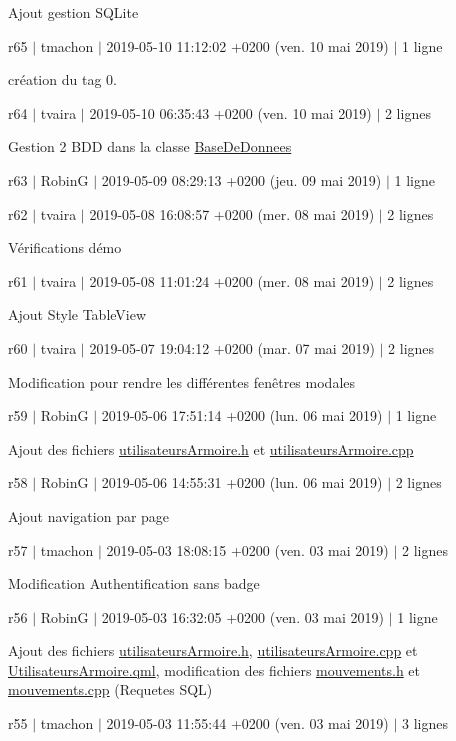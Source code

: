 Ajout gestion S\+Q\+Lite

r65 $\vert$ tmachon $\vert$ 2019-\/05-\/10 11\+:12\+:02 +0200 (ven. 10 mai 2019) $\vert$ 1 ligne

création du tag 0.

r64 $\vert$ tvaira $\vert$ 2019-\/05-\/10 06\+:35\+:43 +0200 (ven. 10 mai 2019) $\vert$ 2 lignes

Gestion 2 B\+DD dans la classe \hyperlink{class_base_de_donnees}{Base\+De\+Donnees}

r63 $\vert$ RobinG $\vert$ 2019-\/05-\/09 08\+:29\+:13 +0200 (jeu. 09 mai 2019) $\vert$ 1 ligne

r62 $\vert$ tvaira $\vert$ 2019-\/05-\/08 16\+:08\+:57 +0200 (mer. 08 mai 2019) $\vert$ 2 lignes

Vérifications démo

r61 $\vert$ tvaira $\vert$ 2019-\/05-\/08 11\+:01\+:24 +0200 (mer. 08 mai 2019) $\vert$ 2 lignes

Ajout Style Table\+View

r60 $\vert$ tvaira $\vert$ 2019-\/05-\/07 19\+:04\+:12 +0200 (mar. 07 mai 2019) $\vert$ 2 lignes

Modification pour rendre les différentes fenêtres modales

r59 $\vert$ RobinG $\vert$ 2019-\/05-\/06 17\+:51\+:14 +0200 (lun. 06 mai 2019) $\vert$ 1 ligne

Ajout des fichiers \hyperlink{utilisateurs_armoire_8h}{utilisateurs\+Armoire.\+h} et \hyperlink{utilisateurs_armoire_8cpp}{utilisateurs\+Armoire.\+cpp}

r58 $\vert$ RobinG $\vert$ 2019-\/05-\/06 14\+:55\+:31 +0200 (lun. 06 mai 2019) $\vert$ 2 lignes

Ajout navigation par page

r57 $\vert$ tmachon $\vert$ 2019-\/05-\/03 18\+:08\+:15 +0200 (ven. 03 mai 2019) $\vert$ 2 lignes

Modification Authentification sans badge

r56 $\vert$ RobinG $\vert$ 2019-\/05-\/03 16\+:32\+:05 +0200 (ven. 03 mai 2019) $\vert$ 1 ligne

Ajout des fichiers \hyperlink{utilisateurs_armoire_8h}{utilisateurs\+Armoire.\+h}, \hyperlink{utilisateurs_armoire_8cpp}{utilisateurs\+Armoire.\+cpp} et \hyperlink{_utilisateurs_armoire_8qml}{Utilisateurs\+Armoire.\+qml}, modification des fichiers \hyperlink{mouvements_8h}{mouvements.\+h} et \hyperlink{mouvements_8cpp}{mouvements.\+cpp} (Requetes S\+QL)

r55 $\vert$ tmachon $\vert$ 2019-\/05-\/03 11\+:55\+:44 +0200 (ven. 03 mai 2019) $\vert$ 3 lignes

